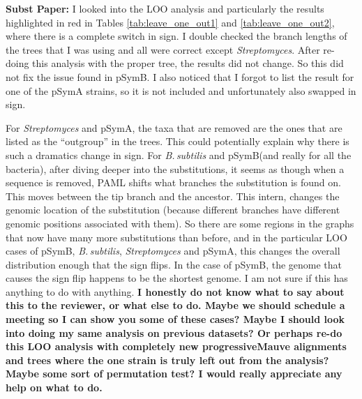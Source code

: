 \documentclass[12pt]{article}
\newcommand{\p}{progressiveMauve\xspace}
\newcommand{\strep}{\textit{Streptomyces}\xspace}
\newcommand{\bass}{\textit{B.\,subtilis}\xspace}
\newcommand{\pa}{pSymA\xspace}
\newcommand{\pb}{pSymB\xspace}
\begin{document}


\textbf{Subst Paper:}
I looked into the LOO analysis and particularly the results highlighted in red in Tables \ref{tab:leave_one_out1} and \ref{tab:leave_one_out2}, where there is a complete switch in sign.
I double checked the branch lengths of the trees that I was using and all were correct except \strep.
After re-doing this analysis with the proper tree, the results did not change.
So this did not fix the issue found in \pb. I also noticed that I forgot to list the result for one of the \pa strains, so it is not included and unfortunately also swapped in sign.

For \strep and \pa, the taxa that are removed are the ones that are listed as the ``outgroup'' in the trees. This could potentially explain why there is such a dramatics change in sign.
For \bass and \pb (and really for all the bacteria), after diving deeper into the substitutions, it seems as though when a sequence is removed, PAML shifts what branches the substitution is found on. This moves between the tip branch and the ancestor. This intern, changes the genomic location of the substitution (because different branches have different genomic positions associated with them). So there are some regions in the graphs that now have many more substitutions than before, and in the particular LOO cases of \pb, \bass, \strep and \pa, this changes the overall distribution enough that the sign flips.
In the case of \pb, the genome that causes the sign flip happens to be the shortest genome. I am not sure if this has anything to do with anything.
\textbf{I honestly do not know what to say about this to the reviewer, or what else to do. Maybe we should schedule a meeting so I can show you some of these cases? Maybe I should look into doing my same analysis on previous datasets? Or perhaps re-do this LOO analysis with completely new \p alignments and trees where the one strain is truly left out from the analysis? Maybe some sort of permutation test? I would really appreciate any help on what to do.}
\end{document}
